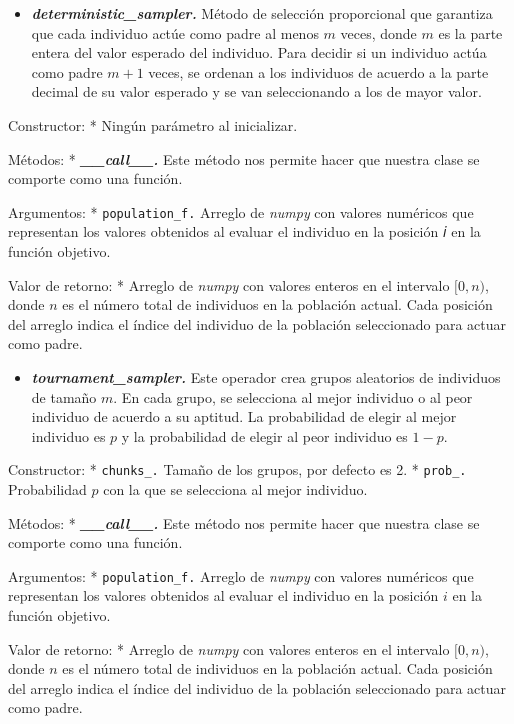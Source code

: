 \documentclass[11pt]{article}
\providecommand{\tightlist}{%
      \setlength{\itemsep}{0pt}\setlength{\parskip}{0pt}}
\begin{document}
    \begin{itemize}
\tightlist
\item
  \emph{\textbf{deterministic\_sampler.}} Método de selección
  proporcional que garantiza que cada individuo actúe como padre al
  menos \(m\) veces, donde \(m\) es la parte entera del valor esperado
  del individuo. Para decidir si un individuo actúa como padre \(m+1\)
  veces, se ordenan a los individuos de acuerdo a la parte decimal de su
  valor esperado y se van seleccionando a los de mayor valor.
\end{itemize}

Constructor: * Ningún parámetro al inicializar.

Métodos: * \emph{\textbf{\_\_call\_\_.}} Este método nos permite hacer
que nuestra clase se comporte como una función.

Argumentos: * \texttt{population\_f.} Arreglo de \emph{numpy} con
valores numéricos que representan los valores obtenidos al evaluar el
individuo en la posición 𝑖 en la función objetivo.

Valor de retorno: * Arreglo de \emph{numpy} con valores enteros en el
intervalo \([0,n)\), donde \(n\) es el número total de individuos en la
población actual. Cada posición del arreglo indica el índice del
individuo de la población seleccionado para actuar como padre.

    \begin{itemize}
\tightlist
\item
  \emph{\textbf{tournament\_sampler.}} Este operador crea grupos
  aleatorios de individuos de tamaño \(m\). En cada grupo, se selecciona
  al mejor individuo o al peor individuo de acuerdo a su aptitud. La
  probabilidad de elegir al mejor individuo es \(p\) y la probabilidad
  de elegir al peor individuo es \(1-p\).
\end{itemize}

Constructor: * \texttt{chunks\_.} Tamaño de los grupos, por defecto es
2. * \texttt{prob\_.} Probabilidad \(p\) con la que se selecciona al
mejor individuo.

Métodos: * \emph{\textbf{\_\_call\_\_.}} Este método nos permite hacer
que nuestra clase se comporte como una función.

Argumentos: * \texttt{population\_f.} Arreglo de \emph{numpy} con
valores numéricos que representan los valores obtenidos al evaluar el
individuo en la posición \(𝑖\) en la función objetivo.

Valor de retorno: * Arreglo de \emph{numpy} con valores enteros en el
intervalo \([0,n)\), donde \(n\) es el número total de individuos en la
población actual. Cada posición del arreglo indica el índice del
individuo de la población seleccionado para actuar como padre.
\end{document}
